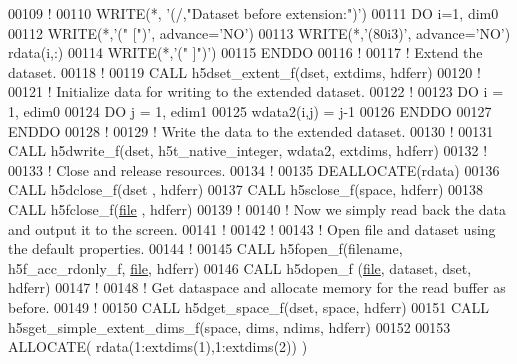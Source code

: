 \begin{DoxyCode}
00109   \textcolor{comment}{!}
00110   \textcolor{keyword}{WRITE}(*, \textcolor{stringliteral}{'(/,"Dataset before extension:")'})
00111   \textcolor{keywordflow}{DO} i=1, dim0
00112      \textcolor{keyword}{WRITE}(*,\textcolor{stringliteral}{'(" [")'}, advance=\textcolor{stringliteral}{'NO'})
00113      \textcolor{keyword}{WRITE}(*,\textcolor{stringliteral}{'(80i3)'}, advance=\textcolor{stringliteral}{'NO'}) rdata(i,:)
00114      \textcolor{keyword}{WRITE}(*,\textcolor{stringliteral}{'(" ]")'})
00115 \textcolor{keywordflow}{  ENDDO}
00116   \textcolor{comment}{!}
00117   \textcolor{comment}{! Extend the dataset.}
00118   \textcolor{comment}{!}
00119   \textcolor{keyword}{CALL }h5dset\_extent\_f(dset, extdims, hdferr)
00120   \textcolor{comment}{!}
00121   \textcolor{comment}{! Initialize data for writing to the extended dataset.}
00122   \textcolor{comment}{!}
00123   \textcolor{keywordflow}{DO} i = 1, edim0
00124      \textcolor{keywordflow}{DO} j = 1, edim1
00125         wdata2(i,j) = j-1
00126 \textcolor{keywordflow}{     ENDDO}
00127 \textcolor{keywordflow}{  ENDDO}
00128   \textcolor{comment}{!}
00129   \textcolor{comment}{! Write the data to the extended dataset.}
00130   \textcolor{comment}{!}
00131   \textcolor{keyword}{CALL }h5dwrite\_f(dset, h5t\_native\_integer, wdata2, extdims, hdferr)
00132   \textcolor{comment}{!}
00133   \textcolor{comment}{! Close and release resources.}
00134   \textcolor{comment}{!}
00135   \textcolor{keyword}{DEALLOCATE}(rdata)
00136   \textcolor{keyword}{CALL }h5dclose\_f(dset , hdferr)
00137   \textcolor{keyword}{CALL }h5sclose\_f(space, hdferr)
00138   \textcolor{keyword}{CALL }h5fclose\_f(\hyperlink{structfile}{file} , hdferr)
00139   \textcolor{comment}{!}
00140   \textcolor{comment}{! Now we simply read back the data and output it to the screen.}
00141   \textcolor{comment}{!}
00142   \textcolor{comment}{!}
00143   \textcolor{comment}{! Open file and dataset using the default properties.}
00144   \textcolor{comment}{!}
00145   \textcolor{keyword}{CALL }h5fopen\_f(filename, h5f\_acc\_rdonly\_f, \hyperlink{structfile}{file}, hdferr)
00146   \textcolor{keyword}{CALL }h5dopen\_f (\hyperlink{structfile}{file}, dataset, dset, hdferr)
00147   \textcolor{comment}{!}
00148   \textcolor{comment}{! Get dataspace and allocate memory for the read buffer as before.}
00149   \textcolor{comment}{!}
00150   \textcolor{keyword}{CALL }h5dget\_space\_f(dset, space, hdferr)
00151   \textcolor{keyword}{CALL }h5sget\_simple\_extent\_dims\_f(space, dims, ndims, hdferr)
00152   
00153   \textcolor{keyword}{ALLOCATE}( rdata(1:extdims(1),1:extdims(2)) )

\end{DoxyCode}
